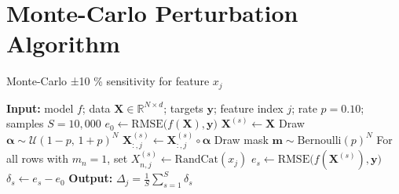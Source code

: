 \documentclass{article}
\theoremstyle{plain}
\theoremstyle{definition}
\theoremstyle{remark}
\begin{document}



\nocite{langley00}





\newpage
\appendix
\onecolumn
\section{Monte-Carlo Perturbation Algorithm}\label{sec:mcalgo}

\begin{algorithm}[h!]
\caption{Monte-Carlo ±10 \% sensitivity for feature $x_j$}
\label{alg:mc10}
\begin{algorithmic}[1]
\STATE \textbf{Input:} model $f$; data $\mathbf{X}\!\in\!\mathbb{R}^{N\times d}$;
      targets $\mathbf{y}$; feature index $j$; rate $p{=}0.10$;
      samples $S{=}10{,}000$
\STATE $e_0 \gets \mathrm{RMSE}\!\bigl(f(\mathbf{X}),\mathbf{y}\bigr)$
    \STATE $\mathbf{X}^{(s)} \gets \mathbf{X}$ 
        \STATE Draw $\boldsymbol{\alpha}\sim\mathcal{U}(1{-}p,\,1{+}p)^{N}$
        \STATE $\mathbf{X}^{(s)}_{:,j}
               \gets \mathbf{X}^{(s)}_{:,j}\!\circ\!\boldsymbol{\alpha}$
        \STATE Draw mask $\mathbf{m}\sim\mathrm{Bernoulli}(p)^{N}$
        \STATE For all rows with $m_n{=}1$,
               set $X^{(s)}_{n,j}\!\gets\!\text{RandCat}(x_j)$
    \ENDIF
    \STATE $e_s \gets \mathrm{RMSE}\!\bigl(f(\mathbf{X}^{(s)}),\mathbf{y}\bigr)$
    \STATE $\delta_s \gets e_s - e_0$
\ENDFOR
\STATE \textbf{Output:}\;
       $\displaystyle\Delta_j = \frac{1}{S}\sum_{s=1}^{S}\delta_s$
\end{algorithmic}
\end{algorithm}
\end{document}
